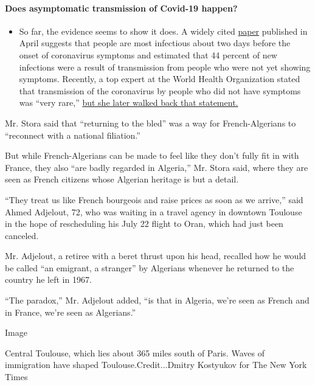 \begin{itemize}
{  \paragraph{Does asymptomatic transmission of Covid-19
  happen?}\label{does-asymptomatic-transmission-of-covid-19-happen}}

  \begin{itemize}
  \tightlist
  \item
    So far, the evidence seems to show it does. A widely cited
    \href{https://www.nature.com/articles/s41591-020-0869-5}{paper}
    published in April suggests that people are most infectious about
    two days before the onset of coronavirus symptoms and estimated that
    44 percent of new infections were a result of transmission from
    people who were not yet showing symptoms. Recently, a top expert at
    the World Health Organization stated that transmission of the
    coronavirus by people who did not have symptoms was ``very rare,''
    \href{https://www.nytimes3xbfgragh.onion/2020/06/09/world/coronavirus-updates.html?action=click\&pgtype=Article\&state=default\&region=MAIN_CONTENT_3\&context=storylines_faq\#link-1f302e21}{but
    she later walked back that statement.}
  \end{itemize}
\end{itemize}

Mr. Stora said that ``returning to the bled'' was a way for
French-Algerians to ``reconnect with a national filiation.''

But while French-Algerians can be made to feel like they don't fully fit
in with France, they also ``are badly regarded in Algeria,'' Mr. Stora
said, where they are seen as French citizens whose Algerian heritage is
but a detail.

``They treat us like French bourgeois and raise prices as soon as we
arrive,'' said Ahmed Adjelout, 72, who was waiting in a travel agency in
downtown Toulouse in the hope of rescheduling his July 22 flight to
Oran, which had just been canceled.

Mr. Adjelout, a retiree with a beret thrust upon his head, recalled how
he would be called ``an emigrant, a stranger'' by Algerians whenever he
returned to the country he left in 1967.

``The paradox,'' Mr. Adjelout added, ``is that in Algeria, we're seen as
French and in France, we're seen as Algerians.''

Image

Central Toulouse, which lies about 365 miles south of Paris. Waves of
immigration have shaped Toulouse.Credit...Dmitry Kostyukov for The New
York Times

